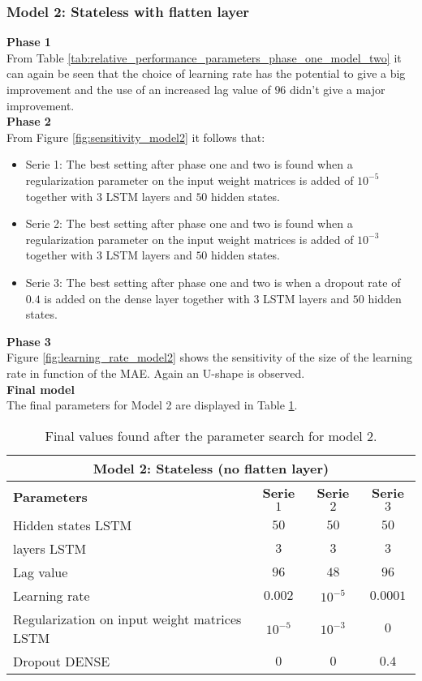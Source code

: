 \subsubsection{Model 2: Stateless with flatten layer}

\textbf{Phase 1}\\
From Table \ref{tab:relative_performance_parameters_phase_one_model_two} it can again be seen that the choice of learning rate has the potential to give a big improvement and the use of an increased lag value of $ 96 $ didn't give a major improvement.\\ 

\textbf{Phase 2}\\
From Figure \ref{fig:sensitivity_model2} it follows that:
\begin{itemize}
	\item Serie 1: The best setting after phase one and two is found when a regularization parameter on the input weight matrices is added of $ 10^{-5} $ together with $ 3 $ LSTM layers and $ 50 $ hidden states. 
	\item Serie 2: The best setting after phase one and two is found when a regularization parameter on the input weight matrices is added of $ 10^{-3} $ together with $ 3 $ LSTM layers and $ 50 $ hidden states.
	\item Serie 3: The best setting after phase one and two is when a dropout rate of $ 0.4 $ is added on the dense layer together with $ 3 $ LSTM layers and $ 50 $ hidden states.
\end{itemize}

\textbf{Phase 3}\\
Figure \ref{fig:learning_rate_model2} shows the sensitivity of the size of the learning rate in function of the MAE. Again an U-shape is observed.\\

\textbf{Final model}\\
The final parameters for Model 2 are displayed in Table \ref{tab:final_model2}.

\begin{table}[h]
	\centering
	\begin{tabular}{@{}l|ccc@{}} \toprule
		\multicolumn{4}{c}{Model 2: Stateless (no flatten layer)}\\\midrule\midrule
		\textbf{Parameters}	& \textbf{Serie $ 1 $} & \textbf{Serie $ 2 $} & \textbf{Serie $ 3 $}\\\midrule
		Hidden states LSTM & $50 $&$ 50 $  & $50 $\\
		layers LSTM & $3 $&$ 3 $  & $3$\\
		Lag value & $96 $&$ 48$  & $96$\\
		Learning rate & $0.002 $&$ 10^{-5}$  & $0.0001$\\\hline
		Regularization on input weight matrices LSTM   & $ 10^{-5} $ & $ 10^{-3} $ & $ 0 $\\
		Dropout DENSE   & $ 0 $ & $ 0 $ & $ 0.4 $\\\bottomrule
	\end{tabular}
	\caption{Final values found after the parameter search for model 2.}
	\label{tab:final_model2}
\end{table}

